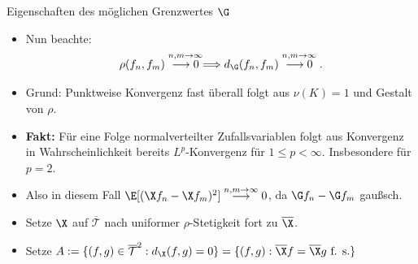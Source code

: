 \begin{frame}{Eigenschaften des möglichen Grenzwertes $\G$}
    \begin{proofs}
        \begin{itemize}
        \item Nun beachte: \[\rho(f_n, f_m) \overset{n,m\to \infty}{\longrightarrow 0} \Longrightarrow d_\G(f_n,f_m) \overset{n,m\to \infty}{\longrightarrow 0}. \]
            \item Grund: Punktweise Konvergenz fast überall folgt aus $\nu(K) = 1$ und Gestalt von $\rho$. 
            \pause 
            \item \textbf{Fakt:} Für eine Folge normalverteilter Zufallsvariablen folgt aus Konvergenz in Wahrscheinlichkeit bereits $L^p$-Konvergenz für $1 \leq p < \infty$. Insbesondere für $p=2$. 
            \item Also in diesem Fall $\E[(\X f_n - \X f_m)^2] \overset{n, m \to \infty}{\longrightarrow} 0$, da $\G f_n - \G f_m$ gaußsch. 
            \pause
            \item Setze $\X$ auf $\overline{\mathcal{T}}$ nach uniformer $\rho$-Stetigkeit fort zu $\overline{\X}$.
      \item Setze $A:= \{(f,g) \in \overline{\mathcal{T}}^2: d_\X(f,g)=0\} = \{(f,g) : \overline{\X}f = \overline{\X}g \text{ f. s.}\}$
        \end{itemize}
    \end{proofs}
\end{frame}

